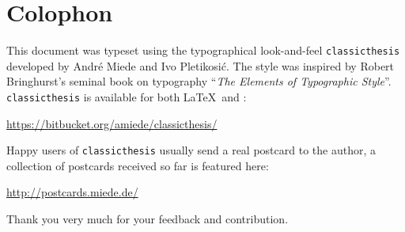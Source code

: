 \pagestyle{empty}

\hfill

\vfill


\section*{Colophon}
This document was typeset using the typographical look-and-feel \texttt{classicthesis} developed by Andr\'e Miede and Ivo Pletikosić.
The style was inspired by Robert Bringhurst's seminal book on typography ``\emph{The Elements of Typographic Style}''.
\texttt{classicthesis} is available for both \LaTeX\ and \mLyX:
\begin{center}
\url{https://bitbucket.org/amiede/classicthesis/}
\end{center}
Happy users of \texttt{classicthesis} usually send a real postcard to the author, a collection of postcards received so far is featured here:
\begin{center}
\url{http://postcards.miede.de/}
\end{center}
Thank you very much for your feedback and contribution.

\bigskip

\noindent\finalVersionString 
